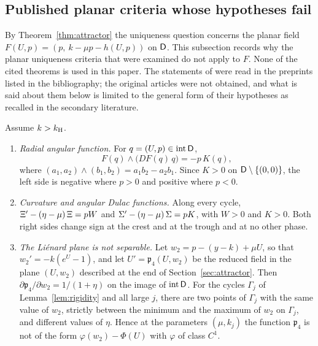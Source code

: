 \subsection{Published planar criteria whose hypotheses fail}\label{neg:sec:planar}
By Theorem~\ref{thm:attractor} the uniqueness question concerns the planar field $F(U,p)=(p,\ k-\mu p-h(U,p))$ on $\mathsf D$. This subsection records why the planar uniqueness criteria that were examined do not apply to $F$. None of the cited theorems is used in this paper. The statements of \cite{SV10,GG21,Sabatini10} were read in the preprints listed in the bibliography; the original articles \cite{Massera54,Zhang86,Duff53} were not obtained, and what is said about them below is limited to the general form of their hypotheses as recalled in the secondary literature.

\begin{proposition}\label{neg:prop:planar}
Assume $k>k_{\mathrm H}$.
\begin{enumerate}[label=\textup{(\roman*)}]
\item \emph{Radial angular function.} For $q=(U,p)\in\operatorname{int}\mathsf D$,
\begin{equation}\label{neg:eq:ram}
F(q)\wedge\bigl(DF(q)\,q\bigr)=-p\,K(q),
\end{equation}
where $(a_1,a_2)\wedge(b_1,b_2)=a_1b_2-a_2b_1$. Since $K>0$ on $\mathsf D\setminus\{(0,0)\}$, the left side is negative where $p>0$ and positive where $p<0$.
\item \emph{Curvature and angular Dulac functions.} Along every cycle, $\Xi'-(\eta-\mu)\,\Xi=pW$ and $\Sigma'-(\eta-\mu)\,\Sigma=pK$, with $W>0$ and $K>0$. Both right sides change sign at the crest and at the trough and at no other phase.
\item \emph{The Li\'enard plane is not separable.} Let $w_2=p-(y-k)+\mu U$, so that $w_2'=-k(e^{U}-1)$, and let $U'=\mathfrak p_4(U,w_2)$ be the reduced field in the plane $(U,w_2)$ described at the end of Section~\ref{sec:attractor}. Then $\partial\mathfrak p_4/\partial w_2=1/(1+\eta)$ on the image of $\operatorname{int}\mathsf D$. For the cycles $\Gamma_j$ of Lemma~\ref{lem:rigidity} and all large $j$, there are two points of $\Gamma_j$ with the same value of $w_2$, strictly between the minimum and the maximum of $w_2$ on $\Gamma_j$, and different values of $\eta$. Hence at the parameters $(\mu,k_j)$ the function $\mathfrak p_4$ is not of the form $\varphi(w_2)-\Phi(U)$ with $\varphi$ of class $C^1$.
\end{enumerate}
\end{proposition}
